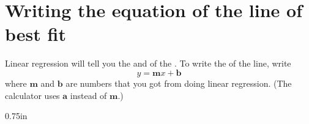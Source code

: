 \section{Writing the equation of the line of best fit}

\begin{tcolorbox}[center,width=5.5in]
    \small
    Linear regression will tell you the  and  
    of the .
    To write the  of the line, write
    \[y = \bm{m} x + \bm{b}\]
    where $\bm{m}$ and $\bm{b}$ are numbers that you got from doing linear regression.
    {
        \footnotesize 
        (The \myTi calculator uses $\bm{a}$ instead of $\bm{m}$.)
    }
\end{tcolorbox}

\vspace{-1\onelineskip}
{0.75in}